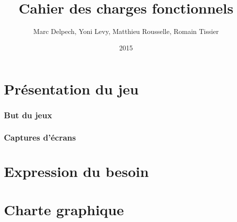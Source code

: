 \documentclass[a4paper]{article}
\title{Cahier des charges fonctionnels}
\author{Marc Delpech, Yoni Levy, Matthieu Rousselle, Romain Tissier}
\date{2015}
\begin{document}
	\maketitle
	\newpage
	\tableofcontents
	\newpage
	\part{Présentation du jeu}
		\section{But du jeux}
		\section{Captures d'écrans}
	\part{Expression du besoin}
	\part{Charte graphique}
\end{document}
